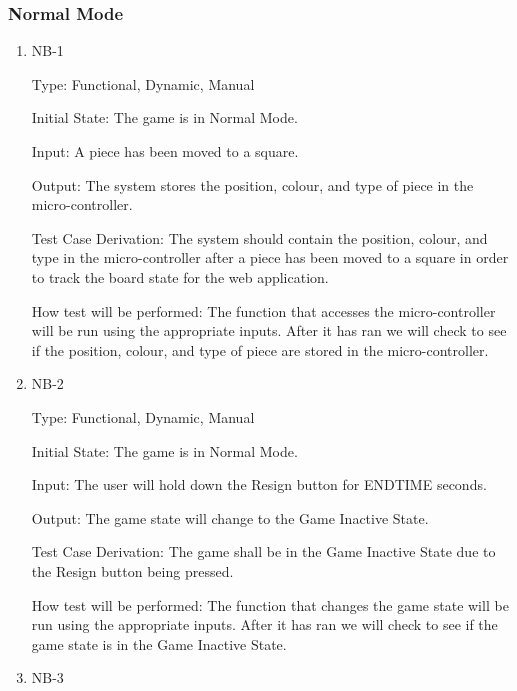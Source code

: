 \documentclass[12pt, titlepage]{article}
\begin{document}
  \subsubsection{Normal Mode}

  \begin{enumerate}

    \item{NB-1\\}

    Type: Functional, Dynamic, Manual
                        
    Initial State: The game is in Normal Mode.
                        
    Input: A piece has been moved to a square.
                        
    Output: The system stores the position, colour, and type of piece in the micro-controller.
                        
    Test Case Derivation: The system should contain the position, colour, and type in the micro-controller
    after a piece has been moved to a square in order to track the board state for the web application.

    How test will be performed: The function that accesses the micro-controller will be run using the appropriate inputs.
    After it has ran we will check to see if the position, colour, and type of piece are stored in the micro-controller.  

    \item{NB-2\\}

    Type: Functional, Dynamic, Manual
                      
    Initial State: The game is in Normal Mode.
                        
    Input: The user will hold down the Resign button for ENDTIME seconds.
                        
    Output: The game state will change to the Game Inactive State.
                        
    Test Case Derivation: The game shall be in the Game Inactive State due to the Resign button being pressed.
    
    How test will be performed: The function that changes the game state will be run using the appropriate inputs.
    After it has ran we will check to see if the game state is in the Game Inactive State.

    \item{NB-3\\}


\end{enumerate}
\end{document}
